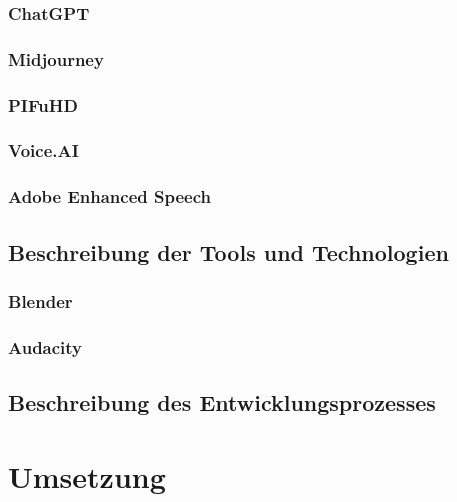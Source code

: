 \documentclass[10pt,a4paper,bibliography=totocnumbered,listof=totocnumbered]{scrartcl}
\begin{document}
\subsubsection{ChatGPT}
\subsubsection{Midjourney}
\subsubsection{PIFuHD}
\subsubsection{Voice.AI}
\subsubsection{Adobe Enhanced Speech}
\subsection{Beschreibung der Tools und Technologien}
\subsubsection{Blender}
\subsubsection{Audacity}
\subsection{Beschreibung des Entwicklungsprozesses}
\section{Umsetzung}
\end{document}
